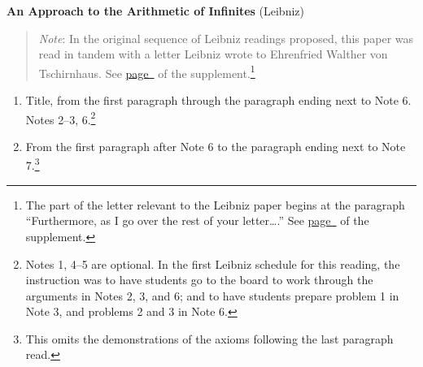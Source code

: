 \documentclass[10pt]{article}
\begin{document}
\textbf{An Approach to the Arithmetic of Infinites} (Leibniz)
\label{LeibnizInfinites}
\begin{quote}
	\small{\emph{Note}: In the original sequence of Leibniz readings proposed, this paper was read in tandem with a letter Leibniz wrote to Ehrenfried Walther von Tschirnhaus. See
	\hyperref[supple.86]{page~\pageref{supple.86}} of the
	supplement.}\footnote{The part of the letter relevant to the Leibniz paper begins at the paragraph ``Furthermore, as I go over the rest of your letter\ldots.'' See \hyperref[supple.92]{page~\pageref{supple.92}} of the supplement.}
\end{quote}
\begin{enumerate}[resume*]
	\item Title, from the first paragraph through the paragraph ending next
		to Note 6. Notes 2--3, 6.\footnote{Notes 1, 4--5 are optional. In the first Leibniz schedule for this reading, the instruction was to have students go to the board to work through the arguments in Notes 2, 3, and 6; and to have students prepare problem 1 in Note 3, and problems 2 and 3 in Note 6.}
	\item From the first paragraph after
		Note 6 to the paragraph ending next to
		Note 7.\footnote{This omits the
			demonstrations of the axioms following the last paragraph read.}
\end{enumerate}
\end{document}
